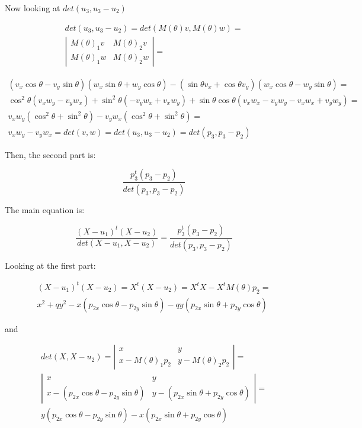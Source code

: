 \documentclass{article}
\begin{document}
Now looking at $det(u_3, u_3-u_2)$

\begin{equation}
\begin{split}
det(u_3, u_3-u_2) = det(M(\theta)v, M(\theta)w)=\\
\left|\begin{array}{cc}M(\theta)_1 v & M(\theta)_2v\\ M(\theta)_1 w & M(\theta)_2w\end{array}\right|=
\end{split}
\end{equation}

\begin{equation*}
\begin{split}
(v_x\cos{\theta}-v_y\sin{\theta})(w_x\sin{\theta} + w_y\cos{\theta})-(\sin{\theta}v_x + \cos{\theta}v_y)(w_x\cos{\theta} - w_y\sin{\theta})=\\
\cos^2{\theta}(v_xw_y-v_yw_x)+\sin^2{\theta}(-v_yw_x+v_xw_y) + \sin{\theta}\cos{\theta}(v_xw_x-v_yw_y-v_xw_x+v_yw_y)=\\
v_xw_y(\cos^2{\theta}+\sin^2{\theta}) - v_yw_x(\cos^2{\theta}+\sin^2{\theta})=\\
v_xw_y-v_yw_x=det(v, w) = det(u_3, u_3-u_2) = det(p_3, p_3-p_2)
\end{split}
\end{equation*}

Then, the second part is:

\begin{equation}
\dfrac{p_3^t(p_3-p_2)}{det(p_3, p_3-p_2)}
\end{equation}

The main equation is:

\begin{equation}
\dfrac{(X-u_1)^t(X-u_2)}{det(X-u_1, X-u_2)} = \dfrac{p_3^t(p_3-p_2)}{det(p_3, p_3-p_2)}
\end{equation}

Looking at the first part:

\begin{eqnarray*}
 	(X-u_1)^t(X-u_2)=X^t(X-u_2)=X^tX -X^tM(\theta)p_2=\\
 	x^2 + qy^2 - x(p_{2x}\cos{\theta} - p_{2y}\sin{\theta}) - qy(p_{2x}\sin{\theta} + p_{2y}\cos{\theta})
\end{eqnarray*}

and

\begin{eqnarray*}
det(X,X-u_2)=\left|
\begin{array}{cc}
x & y\\
x - M(\theta)_1p_2 & y - M(\theta)_2p_2 
\end{array}
\right| =\\
\left|
\begin{array}{cc}
	x & y\\
	x -(p_{2x}\cos{\theta} - p_{2y}\sin{\theta}) & y - (p_{2x}\sin{\theta} + p_{2y}\cos{\theta}) 
\end{array}
\right|=\\
y(p_{2x}\cos{\theta} - p_{2y}\sin{\theta}) - x(p_{2x}\sin{\theta} + p_{2y}\cos{\theta}) 
\end{eqnarray*}
\end{document}
